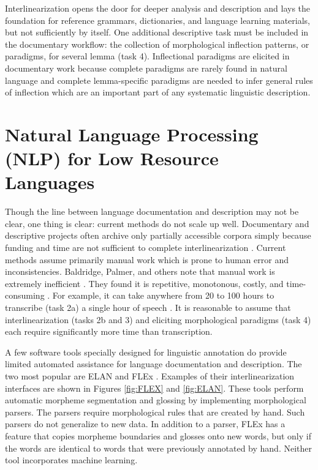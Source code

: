 Interlinearization opens the door for deeper analysis and description and lays the foundation for reference grammars, dictionaries, and language learning materials, but not sufficiently by itself. One additional descriptive task must be included in the documentary workflow: the collection of morphological inflection patterns, or paradigms, for several lemma (task 4). Inflectional paradigms are elicited in documentary work because complete paradigms are rarely found in natural language and complete lemma-specific paradigms are needed to infer general rules of inflection which are an important part of any systematic linguistic description.


\section{Natural Language Processing (NLP) for Low Resource Languages}

Though the line between language documentation and description may not be clear, one thing is clear: current methods do not scale up well. Documentary and descriptive projects often archive only partially accessible corpora simply because funding and time are not sufficient to complete interlinearization \citep{cox_taking_2019}. Current methods assume primarily manual work which is prone to human error and inconsistencies. Baldridge, Palmer, and others note that manual work is extremely inefficient \citep{Baldridge06,baldridge_how_2009,palmer_semi-automated_2009}. They found it is repetitive, monotonous, costly, and time-consuming \citep{duong_natural_2017,he_humanloop_2016}. For example, it can take anywhere from 20 to 100 hours to transcribe (task 2a) a single hour of speech \citep{seifart_language_2018}. It is reasonable to assume that interlinearization (tasks 2b and 3) and eliciting morphological paradigms (task 4) each require  significantly more time than transcription.  

A few software tools specially designed for linguistic annotation do provide limited automated assistance for language documentation and description. The two most popular are ELAN \citep{auer_elan_2010} and FLEx \citep{rogers_review_2010}. Examples of their interlinearization interfaces are shown in Figures \ref{fig:FLEX} and \ref{fig:ELAN}. These tools perform automatic morpheme segmentation and glossing by implementing morphological parsers. The parsers require morphological rules that are created by hand. Such parsers do not generalize to new data. In addition to a parser, FLEx has a feature that copies morpheme boundaries and glosses onto new words, but only if the words are identical to words that were previously annotated by hand. Neither tool incorporates machine learning. 

